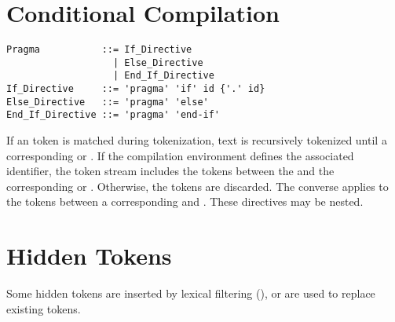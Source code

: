 \section{Conditional Compilation}
\label{sec:conditional-compilation}

\syntax\begin{lstlisting}
Pragma           ::= If_Directive 
                   | Else_Directive 
                   | End_If_Directive 
If_Directive     ::= 'pragma' 'if' id {'.' id}
Else_Directive   ::= 'pragma' 'else'
End_If_Directive ::= 'pragma' 'end-if'
\end{lstlisting}

If an  token is matched during tokenization, text is recursively tokenized until a corresponding  or . If the compilation environment defines the associated identifier, the token stream includes the tokens between the  and the corresponding  or . Otherwise, the tokens are discarded. The converse applies to the tokens between a corresponding  and . These directives may be nested. 





\section{Hidden Tokens}
\label{sec:hidden-tokens}

Some hidden tokens are inserted by lexical filtering (), or are used to replace existing tokens. 





